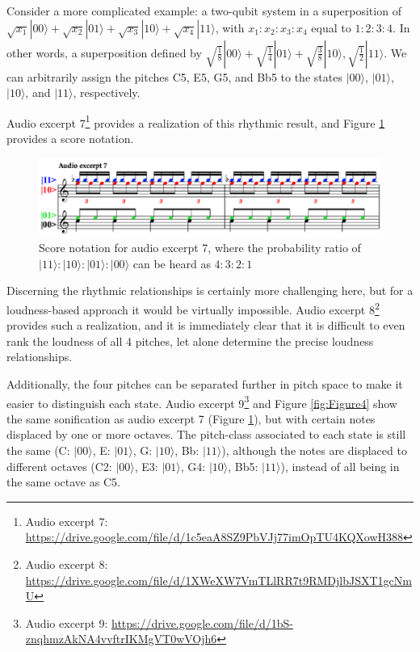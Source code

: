 \documentclass[10pt,twocolumn]{article}
\begin{document}
Consider a more complicated example: a two-qubit system in a superposition of $\sqrt{x_1}|00\rangle + \sqrt{x_2}|01\rangle + \sqrt{x_3}|10\rangle + \sqrt{x_4}|11\rangle$, with $x_1:x_2:x_3:x_4$ equal to $1:2:3:4$. In other words, a superposition defined by $\sqrt{\frac{1}{8}}|00\rangle + \sqrt{\frac{1}{4}}|01\rangle + \sqrt{\frac{3}{8}}|10\rangle, \sqrt{\frac{1}{2}}|11\rangle$. We can arbitrarily assign the pitches C5, E5, G5, and Bb5 to the states $|00\rangle$, $|01\rangle$, $|10\rangle$, and $|11\rangle$, respectively.

Audio excerpt 7\footnote{Audio excerpt 7: \url{https://drive.google.com/file/d/1c5eaA8SZ9PbVJj77imOpTU4KQXowH388}} provides a realization of this rhythmic result, and Figure \ref{fig:Figure3} provides a score notation.

\begin{figure}[h]
\centering
  \includegraphics[width=.45\textwidth]{fig/Figure 3.png}
\caption{Score notation for audio excerpt 7, where the probability ratio of $|11\rangle : |10\rangle : |01\rangle : |00\rangle$ can be heard as $4:3:2:1$}
\label{fig:Figure3}
\end{figure}

Discerning the rhythmic relationships is certainly more challenging here, but for a loudness-based approach it would be virtually impossible. Audio excerpt 8\footnote{Audio excerpt 8: \url{https://drive.google.com/file/d/1XWeXW7VmTLlRR7t9RMDjlbJSXT1gcNmU}} provides such a realization, and it is immediately clear that it is difficult to even rank the loudness of all 4 pitches, let alone determine the precise loudness relationships.

Additionally, the four pitches can be separated further in pitch space to make it easier to distinguish each state. Audio excerpt 9\footnote{Audio excerpt 9: \url{https://drive.google.com/file/d/1bS-znqhmzAkNA4vvftrIKMgVT0wVOjh6}} and Figure \ref{fig:Figure4} show the same sonification as audio excerpt 7 (Figure \ref{fig:Figure3}), but with certain notes displaced by one or more octaves. The pitch-class associated to each state is still the same (C: $|00\rangle$, E: $|01\rangle$, G: $|10\rangle$, Bb: $|11\rangle$), although the notes are displaced to different octaves (C2: $|00\rangle$, E3: $|01\rangle$, G4: $|10\rangle$, Bb5: $|11\rangle$), instead of all being in the same octave as C5.
\end{document}
